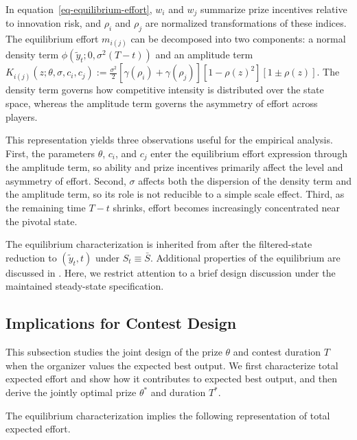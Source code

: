 \documentclass[mnsc]{informs3}
\begin{document}
In equation~\eqref{eq-equilibrium-effort}, $w_i$ and $w_j$ summarize prize incentives relative to innovation risk, and $\rho_i$ and $\rho_j$ are normalized transformations of these indices.
The equilibrium effort $m_{i(j)}$ can be decomposed into two components: a normal density term $\phi(\tilde{y}_t; 0, \sigma^2(T-t))$ and an amplitude term $K_{i(j)}(z;\theta,\sigma,c_i,c_j)
:= \frac{\sigma^2}{2}\left[\gamma(\rho_i)+\gamma(\rho_j)\right]\left[1-\rho(z)^2\right]\left[1\pm\rho(z)\right]$.
The density term governs how competitive intensity is distributed over the state space, whereas the amplitude term governs the asymmetry of effort across players.

This representation yields three observations useful for the empirical analysis.
First, the parameters $\theta$, $c_i$, and $c_j$ enter the equilibrium effort expression through the amplitude term, so ability and prize incentives primarily affect the level and asymmetry of effort.
Second, $\sigma$ affects both the dispersion of the density term and the amplitude term, so its role is not reducible to a simple scale effect.
Third, as the remaining time $T-t$ shrinks, effort becomes increasingly concentrated near the pivotal state.

The equilibrium characterization is inherited from \citet{Ryvkin2022Fight} after the filtered-state reduction to $(\tilde y_t,t)$ under $S_t\equiv\bar S$.
Additional properties of the equilibrium are discussed in \citet{Ryvkin2022Fight}.
Here, we restrict attention to a brief design discussion under the maintained steady-state specification.

\subsection{Implications for Contest Design}\label{sect-design}

This subsection studies the joint design of the prize $\theta$ and contest duration $T$ when the organizer values the expected best output.
We first characterize total expected effort and show how it contributes to expected best output, and then derive the jointly optimal prize $\theta^*$ and duration $T^*$.

The equilibrium characterization implies the following representation of total expected effort.
\end{document}
